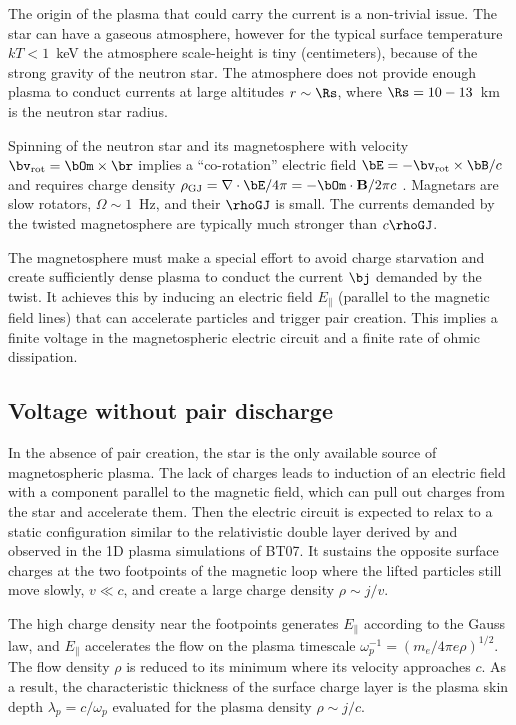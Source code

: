 The origin of the plasma that could carry the current is a non-trivial issue.
The star can have a gaseous atmosphere, however for the typical surface
temperature $kT<1$~keV the atmosphere scale-height is tiny (centimeters),
because of the strong gravity of the neutron star. The atmosphere does not provide
enough plasma to conduct currents at large altitudes $r\sim \Rs$, where
$\Rs=10-13$~km is the neutron star radius.

Spinning of the neutron star and its magnetosphere with velocity
$\bv_{\rm rot}=\bOm\times\br$ implies a ``co-rotation'' electric field
$\bE=-\bv_{\rm rot}\times\bB/c$ and requires charge density
$\rho_\mathrm{GJ}=\nabla\cdot\bE/4\pi=-\bOm\cdot \mathbf{B}/2\pi c$
\citep{goldreich_pulsar_1969}.
Magnetars are slow rotators, $\Omega\sim 1$~Hz,
and their $\rhoGJ$ is small. The currents demanded by the twisted magnetosphere
are typically much stronger than $c\rhoGJ$.

The magnetosphere must make a
special effort to avoid charge starvation and create sufficiently dense plasma
to conduct the current $\bj$ demanded by the twist.
It achieves this by inducing an electric field $E_\parallel$ (parallel to the
magnetic field lines) that can
accelerate particles
and trigger pair creation.
This implies a finite voltage in the magnetospheric electric circuit
and a finite rate of ohmic dissipation.


\subsection{Voltage without pair discharge}
\label{sec:v-no-pair}

In the absence of pair creation,
the star is the only available source of
magnetospheric
plasma. The lack of charges leads to induction of an electric field with
a component parallel to the magnetic field, which can pull out charges from
the star and accelerate them.
Then the
electric circuit is expected to relax to a static configuration
similar to the relativistic double layer derived by
\citet{1982Ap&SS..87...21C}
and observed in the 1D plasma simulations of BT07.
It sustains the opposite surface charges at the two footpoints of the magnetic loop
where the lifted particles still move slowly, $v\ll c$, and create a large charge density
$\rho\sim j/v$.

The high charge density near the footpoints generates $E_\parallel$ according to
the Gauss law, and $E_\parallel$ accelerates the flow on the plasma timescale
$\omega_p^{-1}=(m_e/4\pi e\rho)^{1/2}$. The flow density $\rho$ is reduced to
its minimum where its velocity approaches $c$. As a result, the characteristic
thickness of the surface charge layer is the plasma skin depth
$\lambda_p=c/\omega_p$ evaluated for the plasma density $\rho\sim j/c$.

